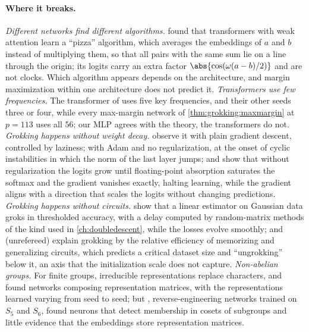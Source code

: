 \begin{refsection}
\paragraph{Where it breaks.} \emph{Different networks find different algorithms.} \Textcite{ZhongEtAl2023} found that transformers with weak attention learn a ``pizza'' algorithm, which averages the embeddings of $a$ and $b$ instead of multiplying them, so that all pairs with the same sum lie on a line through the origin; its logits carry an extra factor $\abs{\cos(\omega(a-b)/2)}$ and are not clocks. Which algorithm appears depends on the architecture, and margin maximization within one architecture does not predict it. \emph{Transformers use few frequencies.} The transformer of \textcite{NandaEtAl2023} uses five key frequencies, and their other seeds three or four, while every max-margin network of \cref{thm:grokking:maxmargin} at $p=113$ uses all $56$; our MLP agrees with the theory, the transformers do not. \emph{Grokking happens without weight decay.} \Textcite{KumarEtAl2024} observe it with plain gradient descent, controlled by laziness; \textcite{ThilakEtAl2024} with Adam and no regularization, at the onset of cyclic instabilities in which the norm of the last layer jumps; and \textcite{PrietoEtAl2025} show that without regularization the logits grow until floating-point absorption saturates the softmax and the gradient vanishes exactly, halting learning, while the gradient aligns with a direction that scales the logits without changing predictions. \emph{Grokking happens without circuits.} \Textcite{LeviEtAl2024} show that a linear estimator on Gaussian data groks in thresholded accuracy, with a delay computed by random-matrix methods of the kind used in \cref{ch:doubledescent}, while the losses evolve smoothly; and \textcite{VarmaEtAl2023} (unrefereed) explain grokking by the relative efficiency of memorizing and generalizing circuits, which predicts a critical dataset size and ``ungrokking'' below it, an axis that the initialization scale does not capture. \emph{Non-abelian groups.} For finite groups, irreducible representations replace characters, and \textcite{ChughtaiEtAl2023} found networks composing representation matrices, with the representations learned varying from seed to seed; but \textcite{StanderEtAl2024}, reverse-engineering networks trained on $S_5$ and $S_6$, found neurons that detect membership in cosets of subgroups and little evidence that the embeddings store representation matrices. 


\end{refsection}
